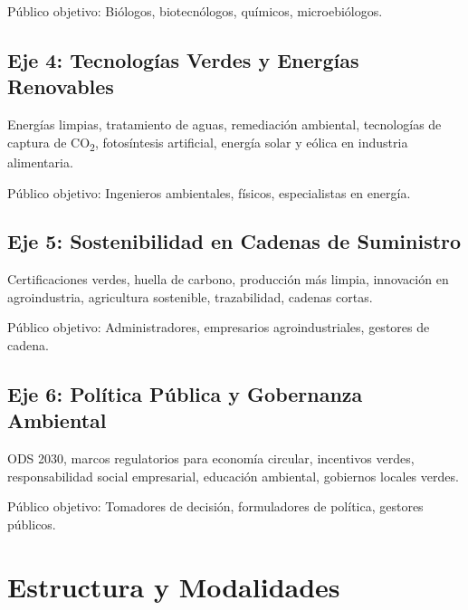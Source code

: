 \documentclass[12pt,a4paper]{article}
\begin{document}
Público objetivo: Biólogos, biotecnólogos, químicos, microebiólogos.

\subsection{Eje 4: Tecnologías Verdes y Energías Renovables}

\begin{tcolorbox}[cajainfo, title=Tópicos principales]
Energías limpias, tratamiento de aguas, remediación ambiental, tecnologías de captura de CO\textsubscript{2}, fotosíntesis artificial, energía solar y eólica en industria alimentaria.
\end{tcolorbox}

Público objetivo: Ingenieros ambientales, físicos, especialistas en energía.

\subsection{Eje 5: Sostenibilidad en Cadenas de Suministro}

\begin{tcolorbox}[cajainfo, title=Tópicos principales]
Certificaciones verdes, huella de carbono, producción más limpia, innovación en agroindustria, agricultura sostenible, trazabilidad, cadenas cortas.
\end{tcolorbox}

Público objetivo: Administradores, empresarios agroindustriales, gestores de cadena.

\subsection{Eje 6: Política Pública y Gobernanza Ambiental}

\begin{tcolorbox}[cajainfo, title=Tópicos principales]
ODS 2030, marcos regulatorios para economía circular, incentivos verdes, responsabilidad social empresarial, educación ambiental, gobiernos locales verdes.
\end{tcolorbox}

Público objetivo: Tomadores de decisión, formuladores de política, gestores públicos.

\section{Estructura y Modalidades}
\end{document}
